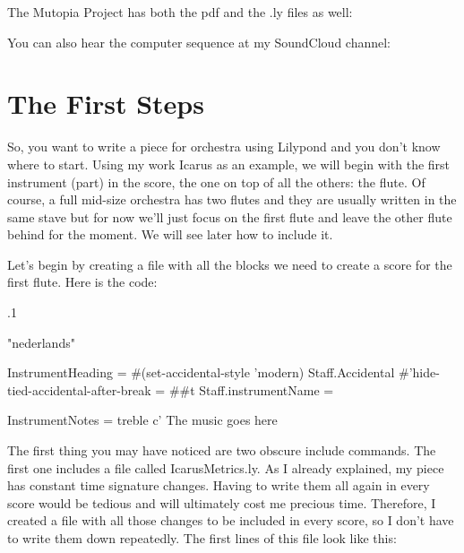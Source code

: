 \documentclass{scrreprt}
\begin{document}
The Mutopia Project has both the pdf and the .ly files as well:

You can also hear the computer sequence at my SoundCloud channel:

\section{The First Steps}

So, you want to write a piece for orchestra using Lilypond and you don't know where to start.
Using my work Icarus as an example, we will begin with the first instrument (part) in the score, the one on top of all the others: the flute.
Of course, a full mid-size orchestra has two flutes and they are usually written in the same stave but for now we'll just focus on the first flute and leave the other flute behind for the moment.
We will see later how to include it.

Let's begin by creating a file with all the blocks we need to create a score for the first flute. Here is the code:

\newenvironment{lilypondcode}
    {\verbatim}
    {\endverbatim}

\begin{lilypondcode}
.1 %


\language "nederlands"




InstrumentHeading = {
  #(set-accidental-style 'modern)
  \override Staff.Accidental #'hide-tied-accidental-after-break = ##t
  \set Staff.instrumentName = \markup {}
}

InstrumentNotes = {
  \numericTimeSignature
  \clef treble
  \relative c' {
    The music goes here
  }
}


\paper {
}
\end{lilypondcode}

The first thing you may have noticed are two obscure include commands. 
The first one includes a file called IcarusMetrics.ly. 
As I already explained, my piece has constant time signature changes.
Having to write them all again in every score would be tedious and will ultimately cost me precious time.
Therefore, I created a file with all those changes to be included in every score, so I don't have to write them down repeatedly.
The first lines of this file look like this:
\end{document}
